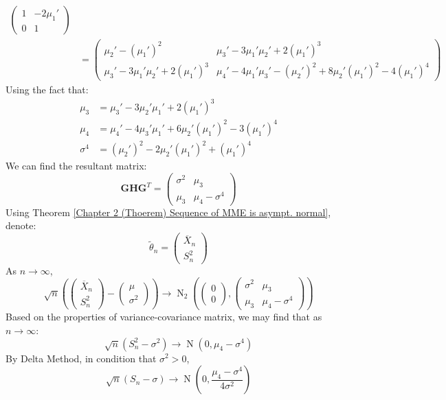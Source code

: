 \documentclass{huhtakm-template-book-v2}
\DeclareMathOperator{\N}{N}
\begin{document}
\begin{eg}
\begin{align*}
\begin{pmatrix}
			1 & -2\mu_{1}'\\
			0 & 1
		\end{pmatrix}\\
		&=\begin{pmatrix}
			\mu_{2}'-(\mu_{1}')^{2} & \mu_{3}'-3\mu_{1}'\mu_{2}'+2(\mu_{1}')^{3}\\
			\mu_{3}'-3\mu_{1}'\mu_{2}'+2(\mu_{1}')^{3} & \mu_{4}'-4\mu_{1}'\mu_{3}'-(\mu_{2}')^{2}+8\mu_{2}'(\mu_{1}')^{2}-4(\mu_{1}')^{4}
		\end{pmatrix}
	\end{align*}
	Using the fact that:
	\begin{align*}
		\mu_{3}&=\mu_{3}'-3\mu_{2}'\mu_{1}'+2(\mu_{1}')^{3}\\ \mu_{4}&=\mu_{4}'-4\mu_{3}'\mu_{1}'+6\mu_{2}'(\mu_{1}')^{2}-3(\mu_{1}')^{4}\\
		\sigma^{4}&=(\mu_{2}')^{2}-2\mu_{2}'(\mu_{1}')^{2}+(\mu_{1}')^{4}
	\end{align*}
	We can find the resultant matrix:
	\begin{equation*}
		\mathbf{GHG}^{T}=\begin{pmatrix}
			\sigma^{2} & \mu_{3}\\
			\mu_{3} & \mu_{4}-\sigma^{4}
		\end{pmatrix}
	\end{equation*}
	Using Theorem \ref{Chapter 2 (Thoerem) Sequence of MME is asympt. normal}, denote:
	\begin{equation*}
		\tilde{\theta}_{n}=\begin{pmatrix}
			\overline{X}_{n}\\ S_{n}^{2}
		\end{pmatrix}
	\end{equation*}
	As $n\to\infty$,
	\begin{equation*}
		\sqrt{n}\left(\begin{pmatrix}
			\overline{X}_{n}\\ S_{n}^{2}
		\end{pmatrix}-\begin{pmatrix}
			\mu\\ \sigma^{2}
		\end{pmatrix}\right)\to\N_{2}\left(\begin{pmatrix}
			0\\ 0
		\end{pmatrix},\begin{pmatrix}
			\sigma^{2} & \mu_{3}\\
			\mu_{3} & \mu_{4}-\sigma^{4}
		\end{pmatrix}\right)
	\end{equation*}
	Based on the properties of variance-covariance matrix, we may find that as $n\to\infty$:
	\begin{equation*}
		\sqrt{n}(S_{n}^{2}-\sigma^{2})\to\N(0,\mu_{4}-\sigma^{4})
	\end{equation*}
	By Delta Method, in condition that $\sigma^{2}>0$,
	\begin{equation*}
		\sqrt{n}(S_{n}-\sigma)\to\N\left(0,\frac{\mu_{4}-\sigma^{4}}{4\sigma^{2}}\right)
	\end{equation*}
\end{eg}
\end{document}
